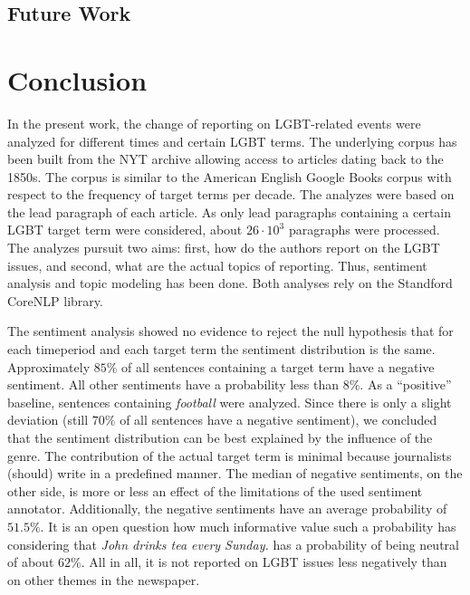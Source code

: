 \documentclass[10pt,a4paper,twocolumn]{scrartcl}
\begin{document}
\subsection{Future Work}

\section{Conclusion}\label{sec:conclusion}
In the present work, the change of reporting on LGBT-related events were analyzed for different times and certain LGBT terms. The underlying corpus has been built from the NYT archive allowing access to articles dating back to the 1850s. The corpus is similar to the American English Google Books corpus with respect to the frequency of target terms per decade. The analyzes were based on the lead paragraph of each article. As only lead paragraphs containing a certain LGBT target term were considered, about $26\cdot 10^3$ paragraphs were processed. The analyzes pursuit two aims: first, how do the authors report on the LGBT issues, and second, what are the actual topics of reporting. Thus, sentiment analysis and topic modeling has been done. Both analyses rely on the Standford CoreNLP library.

The sentiment analysis showed no evidence to reject the null hypothesis that for each timeperiod and each target term the sentiment distribution is the same. Approximately $85\%$ of all sentences containing a target term have a negative sentiment. All other sentiments have a probability less than $8\%$. As a ``positive'' baseline, sentences containing \textit{football} were analyzed. Since there is only a slight deviation (still $70\%$ of all sentences have a negative sentiment), we concluded that the sentiment distribution can be best explained by the influence of the genre. The contribution of the actual target term is minimal because journalists (should) write in a predefined manner. The median of negative sentiments, on the other side, is more or less an effect of the limitations of the used sentiment annotator. Additionally, the negative sentiments have an average probability of $51.5\%$. It is an open question how much informative value such a probability has considering that \textit{John drinks tea every Sunday.} has a probability of being neutral of about $62\%$. All in all, it is not reported on LGBT issues less negatively than on other themes in the newspaper.
\end{document}
